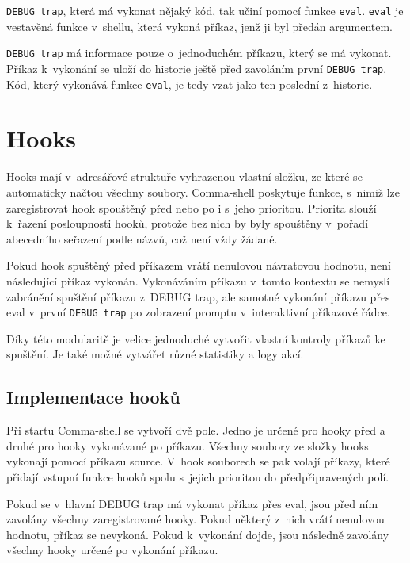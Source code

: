 \documentclass[thesis=M,czech]{FITthesis}[2012/06/26]
\begin{document}
\texttt{DEBUG trap}, která má vykonat nějaký kód, tak učiní pomocí funkce \texttt{eval}. \texttt{eval} je vestavěná funkce v~shellu, která vykoná příkaz, jenž ji byl předán argumentem.

\texttt{DEBUG trap} má informace pouze o~jednoduchém příkazu, který se má vykonat. Příkaz k~vykonání se uloží do historie ještě před zavoláním první \texttt{DEBUG trap}. Kód, který vykonává funkce \texttt{eval}, je tedy vzat jako ten poslední z~historie.



%
%
%
%
%
\section{Hooks}

Hooks mají v~adresářové struktuře vyhrazenou vlastní složku, ze které se automaticky načtou všechny soubory. Comma-shell poskytuje funkce, s~nimiž lze zaregistrovat hook spouštěný před nebo po i s~jeho prioritou. Priorita slouží k~řazení posloupnosti hooků, protože bez nich by byly spouštěny v~pořadí abecedního seřazení podle názvů, což není vždy žádané.

Pokud hook spuštěný před příkazem vrátí nenulovou návratovou hodnotu, není následující příkaz vykonán. Vykonáváním příkazu v~tomto kontextu se nemyslí zabránění spuštění příkazu z~DEBUG trap, ale samotné vykonání příkazu přes eval v~první \texttt{DEBUG trap} po zobrazení promptu v~interaktivní příkazové řádce.

Díky této modularitě je velice jednoduché vytvořit vlastní kontroly příkazů ke spuštění. Je také možné vytvářet různé statistiky a logy akcí.


\subsection{Implementace hooků}

Při startu Comma-shell se vytvoří dvě pole. Jedno je určené pro hooky před a druhé pro hooky vykonávané po příkazu. Všechny soubory ze složky hooks vykonají pomocí příkazu source. V~hook souborech se pak volají příkazy, které přidají vstupní funkce hooků spolu s~jejich prioritou do předpřipravených polí.

Pokud se v~hlavní DEBUG trap má vykonat příkaz přes eval, jsou před ním zavolány všechny zaregistrované hooky. Pokud některý z~nich vrátí nenulovou hodnotu, příkaz se nevykoná. Pokud k~vykonání dojde, jsou následně zavolány všechny hooky určené po vykonání příkazu.
\end{document}
